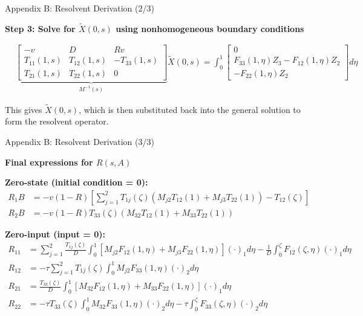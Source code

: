 \documentclass[8pt]{beamer}
\begin{document}
\begin{frame}{Appendix B: Resolvent Derivation (2/3)}

\textbf{Step 3: Solve for \(\tilde{X}(0,s)\) using nonhomogeneous boundary conditions}

\begin{equation}
\begin{aligned}
    &\underbrace{\begin{bmatrix}
        -v & D & Rv \\
        T_{11}(1,s) & T_{12}(1,s) & -T_{33}(1,s) \\
        T_{21}(1,s) & T_{22}(1,s) & 0
    \end{bmatrix}}_{M^{-1}(s)}
    \tilde{X}(0,s)
    =
    \int_0^1
    \begin{bmatrix}
        0 \\
        F_{33}(1,\eta) Z_3 - F_{12}(1,\eta) Z_2 \\
        -F_{22}(1,\eta) Z_2
    \end{bmatrix}
    d\eta
\end{aligned}
\end{equation}

\vspace{1mm}
This gives \(\tilde{X}(0,s)\), which is then substituted back into the general solution to form the resolvent operator.

\end{frame}


\begin{frame}{Appendix B: Resolvent Derivation (3/3)}

\textbf{Final expressions for \({R}(s, A)\)}

\textbf{Zero-state (initial condition = 0):}
\begin{equation*}
\begin{aligned}
    {R}_1 B &= -v(1-R) \left[ \sum_{j=1}^{2} T_{1j}(\zeta) (M_{j2} T_{12}(1) + M_{j3} T_{22}(1)) - T_{12}(\zeta) \right] \\
    {R}_2 B &= -v(1-R) T_{33}(\zeta) (M_{32} T_{12}(1) + M_{33} T_{22}(1))
\end{aligned}
\end{equation*}

\vspace{1mm}
\textbf{Zero-input (input = 0):}
\begin{equation*}
\begin{aligned}
    {R}_{11} &= \sum_{j=1}^2 \frac{T_{1j}(\zeta)}{D} \int_0^1 \left[ M_{j2} F_{12}(1,\eta) + M_{j3} F_{22}(1,\eta) \right] (\cdot)_1 d\eta - \frac{1}{D} \int_0^\zeta F_{12}(\zeta,\eta)(\cdot)_1 d\eta \\
    {R}_{12} &= -\tau \sum_{j=1}^2 T_{1j}(\zeta) \int_0^1 M_{j2} F_{33}(1,\eta) (\cdot)_2 d\eta \\
    {R}_{21} &= \frac{T_{33}(\zeta)}{D} \int_0^1 \left[ M_{32} F_{12}(1,\eta) + M_{33} F_{22}(1,\eta) \right] (\cdot)_1 d\eta \\
    {R}_{22} &= -\tau T_{33}(\zeta) \int_0^1 M_{32} F_{33}(1,\eta) (\cdot)_2 d\eta - \tau \int_0^\zeta F_{33}(\zeta,\eta) (\cdot)_2 d\eta
\end{aligned}
\end{equation*}

\end{frame}
\end{document}
